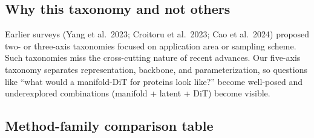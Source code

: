 \documentclass{article}
\begin{document}
\subsection{Why this taxonomy and not others}\label{why-this-taxonomy-and-not-others}

Earlier surveys (Yang et al.~2023; Croitoru et al.~2023; Cao et al.~2024) proposed two- or three-axis taxonomies focused on application area or sampling scheme. Such taxonomies miss the cross-cutting nature of recent advances. Our five-axis taxonomy separates representation, backbone, and parameterization, so questions like ``what would a manifold-DiT for proteins look like?'' become well-posed and underexplored combinations (manifold + latent + DiT) become visible.

\subsection{Method-family comparison table}\label{method-family-comparison-table}
\end{document}
